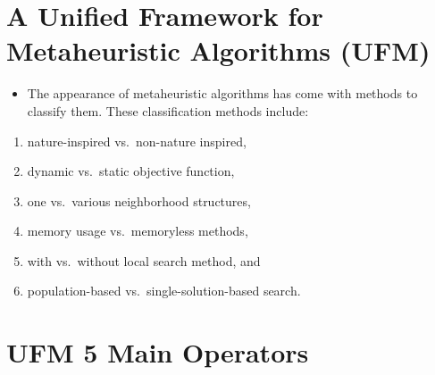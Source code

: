 \documentclass[
  letterpaper,
  DIV=11,
  numbers=noendperiod]{scrreprt}
\providecommand{\tightlist}{%
  \setlength{\itemsep}{0pt}\setlength{\parskip}{0pt}}\usepackage{longtable,booktabs,array}
\begin{document}
\section{A Unified Framework for Metaheuristic Algorithms
(UFM)}\label{a-unified-framework-for-metaheuristic-algorithms-ufm}

\begin{itemize}
\tightlist
\item
  The appearance of metaheuristic algorithms has come with methods to
  classify them. These classification methods include:
\end{itemize}

\begin{enumerate}
\def\labelenumi{(\arabic{enumi})}
\tightlist
\item
  nature-inspired vs.~non-nature inspired,
\item
  dynamic vs.~static objective function,
\item
  one vs.~various neighborhood structures,
\item
  memory usage vs.~memoryless methods,
\item
  with vs.~without local search method, and
\item
  population-based vs.~single-solution-based search.
\end{enumerate}

\section{UFM 5 Main Operators}\label{ufm-5-main-operators}
\end{document}
